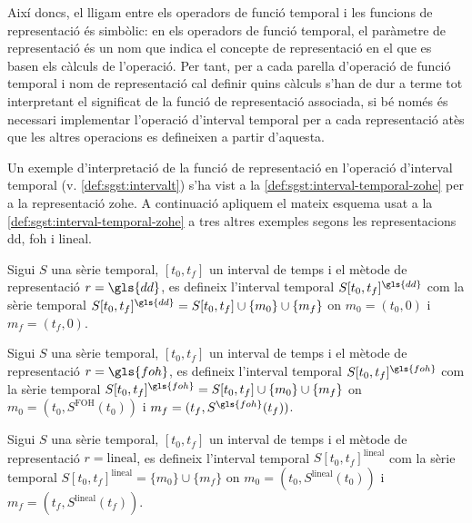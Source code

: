 Així doncs, el lligam entre els operadors de funció temporal i les
funcions de representació és simbòlic: en els operadors de funció
temporal, el paràmetre de representació és un nom que indica el
concepte de representació en el que es basen els càlculs de
l'operació. Per tant, per a cada parella d'operació de funció temporal
i nom de representació cal definir quins càlculs s'han de dur a terme
tot interpretant el significat de la funció de representació
associada, si bé només és necessari implementar l'operació d'interval
temporal per a cada representació atès que les altres operacions es
defineixen a partir d'aquesta. 

Un exemple d'interpretació de la funció de representació en l'operació
d'interval temporal (v. \autoref{def:sgst:intervalt}) s'ha vist a la
\autoref{def:sgst:interval-temporal-zohe} per a la representació
\gls{zohe}. A continuació apliquem el mateix esquema usat a la
\autoref{def:sgst:interval-temporal-zohe} a tres altres exemples
segons les representacions \gls{dd}, \gls{foh} i lineal.

\begin{definition}
  \label{def:sgst:interval-temporal-delta}
  Sigui $S$ una sèrie temporal, $[t_0,t_f]$ un interval de temps i
  el mètode de representació $r=\gls{dd}$, es defineix
  l'interval temporal $S[t_0,t_f]^{\gls{dd}}$ com la sèrie temporal
  $S[t_0,t_f]^{\gls{dd}} = S[t_0,t_f] \cup \{m_0\} \cup \{m_f\}$  on
  $m_0=(t_0,0)$ i $m_f=(t_f,0)$.
\end{definition}

\begin{definition}
  \label{def:sgst:interval-temporal-foh}
  Sigui $S$ una sèrie temporal, $[t_0,t_f]$ un interval de temps i el
  mètode de representació $r=\gls{foh}$, es defineix l'interval
  temporal $S[t_0,t_f]^{\gls{foh}}$ com la sèrie temporal
  $S[t_0,t_f]^{\gls{foh}} = S[t_0,t_f] \cup \{m_0\} \cup \{m_f\}$ on
  $m_0=(t_0,S^{\text{FOH}}(t_0))$ i $m_f=(t_f,S^{\gls{foh}}(t_f))$.
\end{definition}

\begin{definition}
  \label{def:sgst:interval-temporal-lineal}
  Sigui $S$ una sèrie temporal, $[t_0,t_f]$ un interval de temps i
  el mètode de representació $r=\text{lineal}$, es defineix
  l'interval temporal $S[t_0,t_f]^{\text{lineal}}$ com la sèrie temporal
  $S[t_0,t_f]^{\text{lineal}} = \{m_0\} \cup \{m_f\}$ on
  $m_0=(t_0,S^{\text{lineal}}(t_0))$ i
  $m_f=(t_f,S^{\text{lineal}}(t_f))$.
\end{definition}



